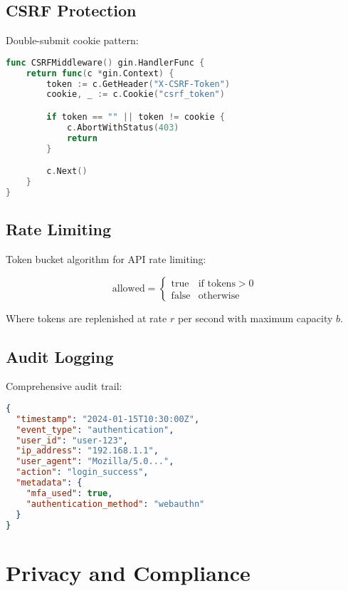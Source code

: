 \documentclass[11pt,a4paper]{article}
\begin{document}
\subsection{CSRF Protection}

Double-submit cookie pattern:

\begin{lstlisting}[language=Go]
func CSRFMiddleware() gin.HandlerFunc {
    return func(c *gin.Context) {
        token := c.GetHeader("X-CSRF-Token")
        cookie, _ := c.Cookie("csrf_token")

        if token == "" || token != cookie {
            c.AbortWithStatus(403)
            return
        }

        c.Next()
    }
}
\end{lstlisting}

\subsection{Rate Limiting}

Token bucket algorithm for API rate limiting:

\begin{equation}
    \text{allowed} = \begin{cases}
        \text{true} & \text{if } \text{tokens} > 0 \\
        \text{false} & \text{otherwise}
    \end{cases}
\end{equation}

Where tokens are replenished at rate $r$ per second with maximum capacity $b$.

\subsection{Audit Logging}

Comprehensive audit trail:

\begin{lstlisting}[language=json]
{
  "timestamp": "2024-01-15T10:30:00Z",
  "event_type": "authentication",
  "user_id": "user-123",
  "ip_address": "192.168.1.1",
  "user_agent": "Mozilla/5.0...",
  "action": "login_success",
  "metadata": {
    "mfa_used": true,
    "authentication_method": "webauthn"
  }
}
\end{lstlisting}

\section{Privacy and Compliance}
\end{document}

